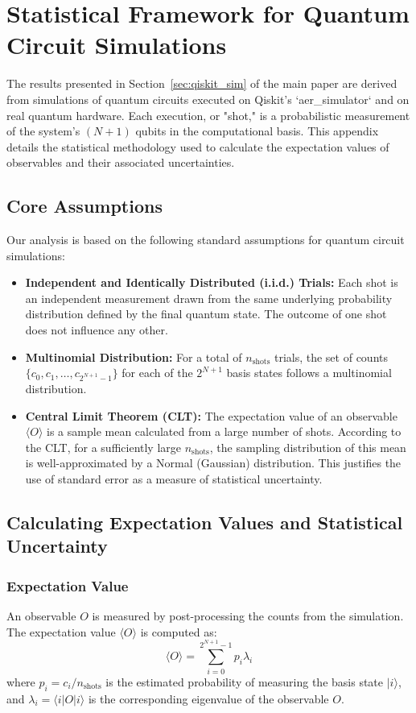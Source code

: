 \section{Statistical Framework for Quantum Circuit Simulations}
\label{appendix:stats-analysis}

The results presented in Section~\ref{sec:qiskit_sim} of the main paper are derived from simulations of quantum circuits executed on Qiskit's `aer\_simulator` and on real quantum hardware. Each execution, or "shot," is a probabilistic measurement of the system's $(N+1)$ qubits in the computational basis. This appendix details the statistical methodology used to calculate the expectation values of observables and their associated uncertainties.

\subsection{Core Assumptions}
Our analysis is based on the following standard assumptions for quantum circuit simulations:
\begin{itemize}
    \item \textbf{Independent and Identically Distributed (i.i.d.) Trials:} Each shot is an independent measurement drawn from the same underlying probability distribution defined by the final quantum state. The outcome of one shot does not influence any other.
    \item \textbf{Multinomial Distribution:} For a total of $n_{\text{shots}}$ trials, the set of counts $\{c_0, c_1, \dots, c_{2^{N+1}-1}\}$ for each of the $2^{N+1}$ basis states follows a multinomial distribution.
    \item \textbf{Central Limit Theorem (CLT):} The expectation value of an observable $\langle O \rangle$ is a sample mean calculated from a large number of shots. According to the CLT, for a sufficiently large $n_{\text{shots}}$, the sampling distribution of this mean is well-approximated by a Normal (Gaussian) distribution. This justifies the use of standard error as a measure of statistical uncertainty.
\end{itemize}

\subsection{Calculating Expectation Values and Statistical Uncertainty}

\subsubsection{Expectation Value}
An observable $O$ is measured by post-processing the counts from the simulation. The expectation value $\langle O \rangle$ is computed as:
\begin{equation}
    \langle O \rangle = \sum_{i=0}^{2^{N+1}-1} p_i \lambda_i
\end{equation}
where $p_i = c_i / n_{\text{shots}}$ is the estimated probability of measuring the basis state $|i\rangle$, and $\lambda_i = \langle i | O | i \rangle$ is the corresponding eigenvalue of the observable $O$.

